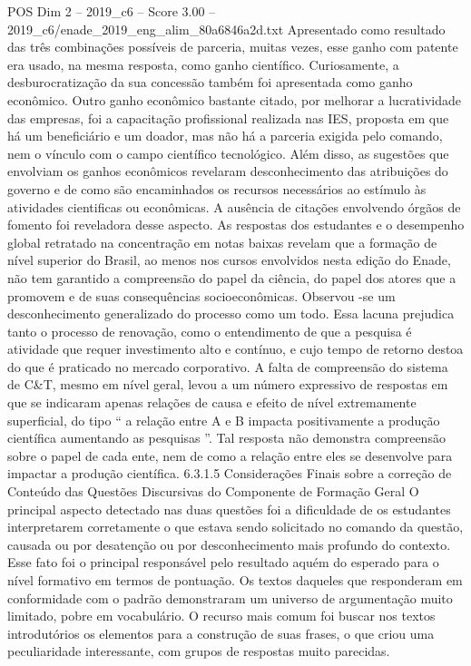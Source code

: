 \begin{textsample}{POS Dim 2 – 2019\_c6 – Score 3.00 – 2019\_c6/enade\_2019\_eng\_alim\_80a6846a2d.txt}
Apresentado como resultado das três combinações possíveis de parceria, muitas vezes, esse ganho com patente era usado, na mesma resposta, como ganho científico.
Curiosamente, a desburocratização da sua concessão também foi apresentada como ganho econômico.
Outro ganho econômico bastante citado, por melhorar a lucratividade das empresas, foi a capacitação profissional realizada nas IES, proposta em que há um beneficiário e um doador, mas não há a parceria exigida pelo comando, nem o vínculo com o campo científico tecnológico.
Além disso, as sugestões que envolviam os ganhos econômicos revelaram desconhecimento das atribuições do governo e de como são encaminhados os recursos necessários ao estímulo às atividades cientificas ou econômicas.
A ausência de citações envolvendo órgãos de fomento foi reveladora desse aspecto.
As respostas dos estudantes e o desempenho global retratado na concentração em notas baixas revelam que a formação de nível superior do Brasil, ao menos nos cursos envolvidos nesta edição do Enade, não tem garantido a compreensão do papel da ciência, do papel dos atores que a promovem e de suas consequências socioeconômicas.
Observou -se um desconhecimento generalizado do processo como um todo.
Essa lacuna prejudica tanto o processo de renovação, como o entendimento de que a pesquisa é atividade que requer investimento alto e contínuo, e cujo tempo de retorno destoa do que é praticado no mercado corporativo.
A falta de compreensão do sistema de C\&T, mesmo em nível geral, levou a um número expressivo de respostas em que se indicaram apenas relações de causa e efeito de nível extremamente superficial, do tipo “ a relação entre A e B impacta positivamente a produção científica aumentando as pesquisas ”.
Tal resposta não demonstra compreensão sobre o papel de cada ente, nem de como a relação entre eles se desenvolve para impactar a produção científica. 6.3.1.5 Considerações Finais sobre a correção de Conteúdo das Questões Discursivas do Componente de Formação Geral O principal aspecto detectado nas duas questões foi a dificuldade de os estudantes interpretarem corretamente o que estava sendo solicitado no comando da questão, causada ou por desatenção ou por desconhecimento mais profundo do contexto.
Esse fato foi o principal responsável pelo resultado aquém do esperado para o nível formativo em termos de pontuação.
Os textos daqueles que responderam em conformidade com o padrão demonstraram um universo de argumentação muito limitado, pobre em vocabulário.
O recurso mais comum foi buscar nos textos introdutórios os elementos para a construção de suas frases, o que criou uma peculiaridade interessante, com grupos de respostas muito parecidas.

\end{textsample}
